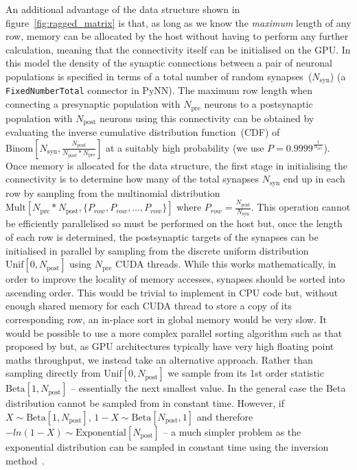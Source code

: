 \documentclass[utf8]{frontiersSCNS} %
\begin{document}
An additional advantage of the data structure shown in figure~\ref{fig:ragged_matrix} is that, as long as we know the \textit{maximum} length of any row, memory can be allocated by the host without having to perform any further calculation, meaning that the connectivity itself can be initialised on the GPU.
In this model the density of the synaptic connections between a pair of neuronal populations is specified in terms of a total number of random synapses~($N_{\text{syn}}$) (a \lstinline{FixedNumberTotal} connector in PyNN).
The maximum row length when connecting a presynaptic population with $N_{\text{pre}}$ neurons to a postsynaptic population with $N_{\text{post}}$ neurons using this connectivity can be obtained by evaluating the inverse cumulative distribution function~(CDF) of $\text{Binom}[N_{\text{syn}}, \frac{N_{\text{post}}}{N_{\text{post}} * N_{\text{pre}}}]$ at a suitably high probability (we use $P=0.9999^\frac{1}{N_{\text{pre}}}$).
Once memory is allocated for the data structure, the first stage in initialising the connectivity is to determine how many of the total synapses $N_{\text{syn}}$ end up in each row by sampling from the multinomial distribution $\text{Mult}[N_{\text{pre}} * N_{\text{post}}, \{P_{row}, P_{row}, \ldots, P_{row}\}]$ where $P_{row} = \frac{N_{\text{post}}}{N_{\text{syn}}}$.
This operation cannot be efficiently parallelised so must be performed on the host but, once the length of each row is determined, the postsynaptic targets of the synapses can be initialised in parallel by sampling from the discrete uniform distribution $\text{Unif}[0, N_{\text{post}}]$ using $N_{\text{pre}}$ CUDA threads.
While this works mathematically, in order to improve the locality of memory accesses, synapses should be sorted into ascending order.
This would be trivial to implement in CPU code but, without enough shared memory for each CUDA thread to store a copy of its corresponding row, an in-place sort in global memory would be very slow.
It would be possible to use a more complex parallel sorting algorithm such as that proposed by \citet{Awan2016} but, as GPU architectures typically have very high floating point maths throughput, we instead take an alternative approach.
Rather than sampling directly from $\text{Unif}[0, N_{\text{post}}]$ we sample from its 1st order statistic $\text{Beta}[1, N_{\text{post}}]$ -- essentially the next smallest value.
In the general case the Beta distribution cannot be sampled from in constant time.
However, if $X \sim \text{Beta}[1, N_{\text{post}}]$, $1 - X \sim \text{Beta}[N_{\text{post}}, 1]$ and therefore $-ln(1 - X) \sim \text{Exponential}[N_{\text{post}}]$ -- a much simpler problem as the exponential distribution can be sampled in constant time using the inversion method~\citep[p29]{DevroyeLuc2013}.
\end{document}
